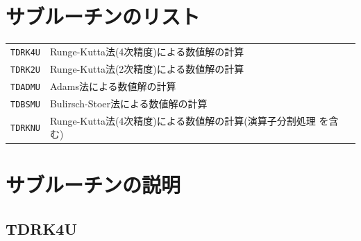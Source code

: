 
\section{サブルーチンのリスト}

\vspace{1em}
\begin{tabular}{ll}
{\tt TDRK4U} & Runge-Kutta法(4次精度)による数値解の計算\\
{\tt TDRK2U} & Runge-Kutta法(2次精度)による数値解の計算\\
{\tt TDADMU} & Adams法による数値解の計算\\
{\tt TDBSMU} & Bulirsch-Stoer法による数値解の計算\\
{\tt TDRKNU} & Runge-Kutta法(4次精度)による数値解の計算(演算子分割処理
を含む)\\
\end{tabular}


\section{サブルーチンの説明}

\subsection{TDRK4U}

